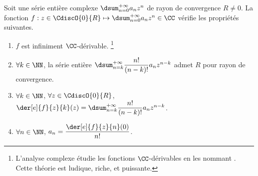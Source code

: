 

\begin{preli} \label{der-power-serie}
    Soit une série entière complexe $\dsum_{n=0}^{+\infty} a_n z^n$ de rayon de convergence $R \neq 0$.
    La fonction $f: z \in \CdiscO{0}{R} \mapsto \dsum_{n=0}^{+\infty} a_n z^n \in \CC$ vérifie les propriétés suivantes.
    \begin{enumerate}
    	\item $f$ est infiniment $\CC$-dérivable.%
		\footnote{
			L'analyse complexe étudie les fonctions $\CC$-dérivables en les nommant .
			Cette théorie est ludique, riche, et puissante.
		}

    	\item $\forall k \in \NN$,
		la série entière $\dsum_{n = k}^{+\infty} \dfrac{n!}{(n-k)!} a_n z^{n - k}$ admet $R$ pour rayon de convergence.

    	\item $\forall k \in \NN$, $\forall z \in \CdiscO{0}{R}$,
		$\der[e]{f}{z}{k}(z) = \dsum_{n = k}^{+\infty} \dfrac{n!}{(n-k)!} a_n z^{n - k}$.

    	\item \label{a_n-value}
		$\forall n \in \NN$,  $a_n = \dfrac{\der[e]{f}{z}{n}(0)}{n!}$.
    \end{enumerate}
\end{preli}


